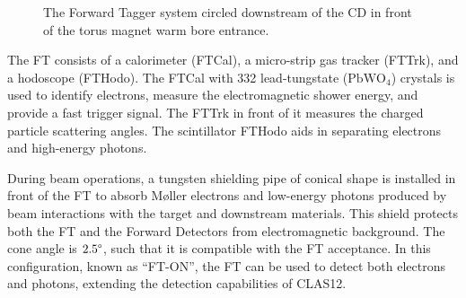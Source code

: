     \begin{figure}
        \centering{}
        \caption[FT]{The Forward Tagger system circled downstream of the CD in front of the torus magnet warm bore entrance.}
        \label{fig::ft}
    \end{figure}
    
    The FT consists of a calorimeter (FTCal), a micro-strip gas tracker (FTTrk), and a hodoscope (FTHodo).
    The FTCal with 332 lead-tungstate ($\text{PbWO}_4$) crystals is used to identify electrons, measure the electromagnetic shower energy, and provide a fast trigger signal.
    The FTTrk in front of it measures the charged particle scattering angles.
    The scintillator FTHodo aids in separating electrons and high-energy photons.

    During beam operations, a tungsten shielding pipe of conical shape is installed in front of the FT to absorb M\o ller electrons and low-energy photons produced by beam interactions with the target and downstream materials.
    This shield protects both the FT and the Forward Detectors from electromagnetic background.
    The cone angle is $2.5\degree$, such that it is compatible with the FT acceptance.
    In this configuration, known as ``FT-ON'', the FT can be used to detect both electrons and photons, extending the detection capabilities of CLAS12.
    
